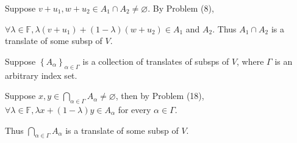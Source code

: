 \documentclass[a4paper, 11pt, UTF8]{article}
\def\Fbb{{\mathbb{F}}}
\begin{document}
\begin{large}
\par\quad
Suppose $v+u_1,w+u_2\in A_1\cap A_2\neq\varnothing$. By Problem (8),\par\quad
$\forall\lambda\in\Fbb,\lambda(v+u_1)+(1-\lambda)(w+u_2)\in A_1$ and $A_2$. Thus $A_1\cap A_2$ is a translate of some subsp of $V.$\PfEnd
\SepLine

\par\quad
Suppose $\left\{A_{\alpha}\right\}_{\alpha\in\Gamma}$ is a collection of translates of subsps of $V$, where $\Gamma$ is an arbitrary index set.\par\quad
Suppose $x,y\in\bigcap_{\alpha\in\Gamma}A_{\alpha}\neq\varnothing$, then by Problem (18), $\forall\lambda\in\Fbb,\lambda x+(1-\lambda)y\in A_{\alpha}$ for every $\alpha\in\Gamma$.\par\quad
Thus $\bigcap_{\alpha\in\Gamma}A_\alpha$ is a translate of some subsp of $V$.\,\PfEnd
\SepLine


\end{large}
\end{document}
